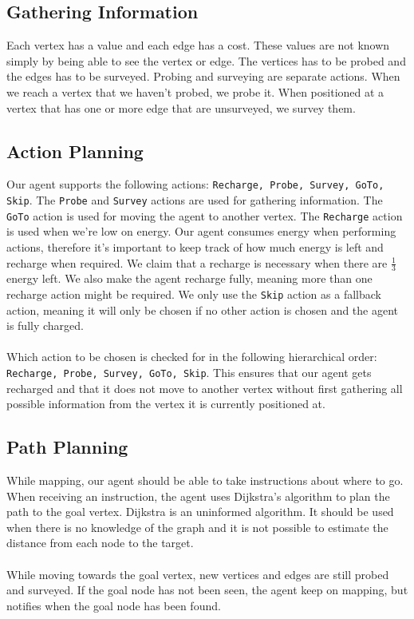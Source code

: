 \documentclass[11pt]{report}
\begin{document}
\subsection*{Gathering Information}
Each vertex has a value and each edge has a cost. These values are not known simply  by being able to see the vertex or edge. The vertices has to be probed and the edges has to be surveyed. Probing and surveying are separate actions. When we reach a vertex that we haven't probed, we probe it. When positioned at a vertex that has one or more edge that are unsurveyed, we survey them.

\subsection*{Action Planning}
Our agent supports the following actions: {\tt Recharge, Probe, Survey, GoTo, Skip}. The {\tt Probe} and {\tt Survey} actions are used for gathering information. The {\tt GoTo} action is used for moving the agent to another vertex. The {\tt Recharge} action is used when we're low on energy. Our agent consumes energy when performing actions, therefore it's important to keep track of how much energy is left and recharge when required. We claim that a recharge is necessary when there are $\frac{1}{3}$ energy left. We also make the agent recharge fully, meaning more than one recharge action might be required. We only use the {\tt Skip} action as a fallback action, meaning it will only be chosen if no other action is chosen and the agent is fully charged.\\
\\
Which action to be chosen is checked for in the following hierarchical order: {\tt Recharge, Probe, Survey, GoTo, Skip}. This ensures that our agent gets recharged and that it does not move to another vertex without first gathering all possible information from the vertex it is currently positioned at.

\subsection*{Path Planning}
While mapping, our agent should be able to take instructions about where to go. When receiving an instruction, the agent uses Dijkstra's algorithm to plan the path to the goal vertex. Dijkstra is an uninformed algorithm. It should be used when there is no knowledge of the graph and it is not possible to estimate the distance from each node to the target.\\
\\
While moving towards the goal vertex, new vertices and edges are still probed and surveyed. If the goal node has not been seen, the agent keep on mapping, but notifies when the goal node has been found.
\end{document}
